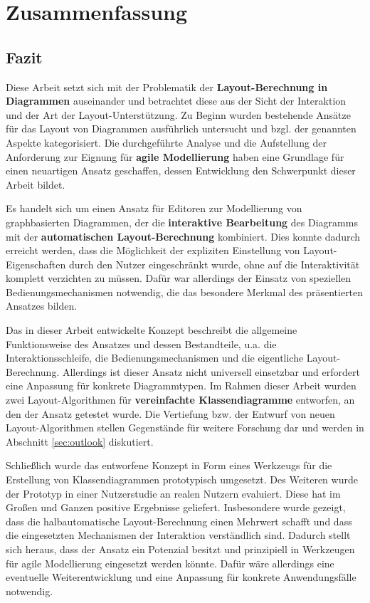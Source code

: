 
\chapter{Zusammenfassung}
\label{chapter:summary}

\section{Fazit}

Diese Arbeit setzt sich mit der Problematik der \textbf{Layout-Berechnung in Diagrammen} auseinander und betrachtet diese aus der Sicht der Interaktion und der Art der Layout-Unterstützung. Zu Beginn wurden bestehende Ansätze für das Layout von Diagrammen ausführlich untersucht und bzgl. der genannten Aspekte kategorisiert. Die durchgeführte Analyse und die Aufstellung der Anforderung zur Eignung für \textbf{agile Modellierung} haben eine Grundlage für einen neuartigen Ansatz geschaffen, dessen Entwicklung den Schwerpunkt dieser Arbeit bildet.

Es handelt sich um einen Ansatz für Editoren zur Modellierung von graphbasierten Diagrammen, der die \textbf{interaktive Bearbeitung} des Diagramms mit der \textbf{automatischen Layout-Be\-rech\-nung} kombiniert. Dies konnte dadurch erreicht werden, dass die Möglichkeit der expliziten Einstellung von Layout-Eigenschaften durch den Nutzer eingeschränkt wurde, ohne auf die Interaktivität komplett verzichten zu müssen. Dafür war allerdings der Einsatz von speziellen Bedienungsmechanismen notwendig, die das besondere Merkmal des präsentierten Ansatzes bilden.

Das in dieser Arbeit entwickelte Konzept beschreibt die allgemeine Funktionsweise des Ansatzes und dessen Bestandteile, u.a. die Interaktionsschleife, die Bedienungsmechanismen und die eigentliche Layout-Berechnung. Allerdings ist dieser Ansatz nicht universell einsetzbar und erfordert eine Anpassung für konkrete Diagrammtypen. Im Rahmen dieser Arbeit wurden zwei Layout-Algorithmen für \textbf{vereinfachte Klassendiagramme} entworfen, an den der Ansatz getestet wurde. Die Vertiefung bzw. der Entwurf von neuen Layout-Algorithmen stellen Gegenstände für weitere Forschung dar und werden in Abschnitt \ref{sec:outlook} diskutiert.

Schließlich wurde das entworfene Konzept in Form eines Werkzeugs für die Erstellung von Klassendiagrammen prototypisch umgesetzt. Des Weiteren wurde der Prototyp in einer Nutzerstudie an realen Nutzern evaluiert. Diese hat im Großen und Ganzen positive Ergebnisse geliefert. Insbesondere wurde gezeigt, dass die halbautomatische Layout-Berechnung einen Mehrwert schafft und dass die eingesetzten Mechanismen der Interaktion verständlich sind. Dadurch stellt sich heraus, dass der Ansatz ein Potenzial besitzt und prinzipiell in Werkzeugen für agile Modellierung eingesetzt werden könnte. Dafür wäre allerdings eine eventuelle Weiterentwicklung und eine Anpassung für konkrete Anwendungsfälle notwendig.

